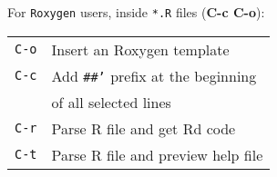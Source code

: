 \documentclass[a4paper]{article}
\newenvironment{tabI}{\begin{tabular}{p{18mm}l}}{\end{tabular}}
\begin{document}
\begin{multicols}{2}
  For \texttt{Roxygen} users, inside \texttt{*.R} files (\textbf{C-c C-o}):
  
  \begin{tabI}
    \texttt{C-o} & Insert an Roxygen template\\
    \texttt{C-c} & Add \texttt{\#\#\rq}  prefix at the beginning \\
                 & of all selected lines\\
    \texttt{C-r} & Parse R file and get Rd code\\
    \texttt{C-t} & Parse R file and preview help file \\
  \end{tabI}

\end{multicols}
\end{document}
